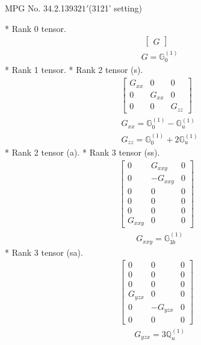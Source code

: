 \documentclass[fleqn,8pt,landscape]{jsarticle}
\begin{document}
\setcounter{MaxMatrixCols}{32}

\renewcommand{\tablename}{Table~}
\renewcommand{\figurename}{Figure~}
\begin{center}
\LARGE
MPG No. 34.2.139\quad$321'$\quad(3121' setting)
\end{center}
* Rank 0 tensor.
\begin{align*}
\begin{bmatrix} G \end{bmatrix}
\end{align*}
\begin{align*}
& G = \mathbb{G}_{0}^{(1)}
\end{align*}
* Rank 1 tensor.
* Rank 2 tensor (s).
\begin{align*}
\begin{bmatrix} G_{xx} & 0 & 0 \\ 0 & G_{xx} & 0 \\ 0 & 0 & G_{zz} \end{bmatrix}
\end{align*}
\begin{align*}
& G_{xx} = \mathbb{G}_{0}^{(1)} - \mathbb{G}_{u}^{(1)} \\
& G_{zz} = \mathbb{G}_{0}^{(1)} + 2 \mathbb{G}_{u}^{(1)}
\end{align*}
* Rank 2 tensor (a).
* Rank 3 tensor (ss).
\begin{align*}
\begin{bmatrix} 0 & G_{xxy} & 0 \\ 0 & - G_{xxy} & 0 \\ 0 & 0 & 0 \\ 0 & 0 & 0 \\ 0 & 0 & 0 \\ G_{xxy} & 0 & 0 \end{bmatrix}
\end{align*}
\begin{align*}
& G_{xxy} = \mathbb{G}_{3b}^{(1)}
\end{align*}
* Rank 3 tensor (sa).
\begin{align*}
\begin{bmatrix} 0 & 0 & 0 \\ 0 & 0 & 0 \\ 0 & 0 & 0 \\ G_{yzx} & 0 & 0 \\ 0 & - G_{yzx} & 0 \\ 0 & 0 & 0 \end{bmatrix}
\end{align*}
\begin{align*}
& G_{yzx} = 3 \mathbb{Q}_{u}^{(1)}
\end{align*}
\end{document}
